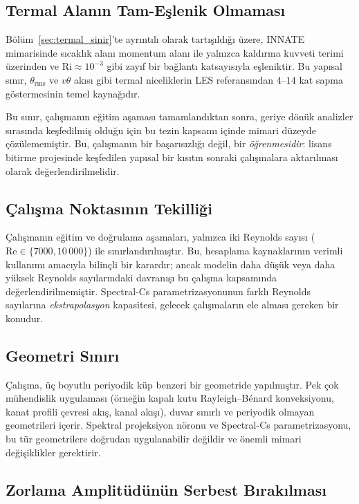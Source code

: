 \subsection{Termal Alanın Tam-Eşlenik Olmaması}

Bölüm~\ref{sec:termal_sinir}'te ayrıntılı olarak tartışıldığı üzere, INNATE mimarisinde sıcaklık alanı momentum alanı ile yalnızca kaldırma kuvveti terimi üzerinden ve $\mathrm{Ri}\approx 10^{-3}$ gibi zayıf bir bağlantı katsayısıyla eşleniktir. Bu yapısal sınır, $\theta_{\mathrm{rms}}$ ve $v\theta$ akısı gibi termal niceliklerin LES referansından $4$--$14$ kat sapma göstermesinin temel kaynağıdır.

Bu sınır, çalışmanın eğitim aşaması tamamlandıktan sonra, geriye dönük analizler sırasında keşfedilmiş olduğu için bu tezin kapsamı içinde mimari düzeyde çözülememiştir. Bu, çalışmanın bir başarısızlığı değil, bir \emph{öğrenmesidir}: lisans bitirme projesinde keşfedilen yapısal bir kısıtın sonraki çalışmalara aktarılması olarak değerlendirilmelidir.

\subsection{Çalışma Noktasının Tekilliği}

Çalışmanın eğitim ve doğrulama aşamaları, yalnızca iki Reynolds sayısı ($\mathrm{Re}\in\{7000,10\,000\}$) ile sınırlandırılmıştır. Bu, hesaplama kaynaklarının verimli kullanımı amacıyla bilinçli bir karardır; ancak modelin daha düşük veya daha yüksek Reynolds sayılarındaki davranışı bu çalışma kapsamında değerlendirilmemiştir. Spectral-Cs parametrizasyonunun farklı Reynolds sayılarına \emph{ekstrapolasyon} kapasitesi, gelecek çalışmaların ele alması gereken bir konudur.

\subsection{Geometri Sınırı}

Çalışma, üç boyutlu periyodik küp benzeri bir geometride yapılmıştır. Pek çok mühendislik uygulaması (örneğin kapalı kutu Rayleigh--B\'enard konveksiyonu, kanat profili çevresi akış, kanal akışı), duvar sınırlı ve periyodik olmayan geometrileri içerir. Spektral projeksiyon nöronu ve Spectral-Cs parametrizasyonu, bu tür geometrilere doğrudan uygulanabilir değildir ve önemli mimari değişiklikler gerektirir.

\subsection{Zorlama Amplitüdünün Serbest Bırakılması}

